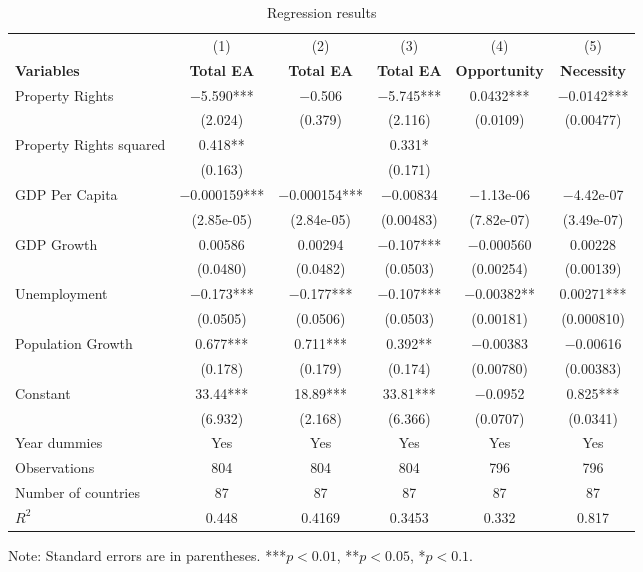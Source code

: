 \documentclass[12pt]{article}
\begin{document}
\begin{table}[H]
    \centering
    \caption{Regression results}
    \label{tab:regression_results}
    \small
    \begin{tabular}{l c c c c c}
        \toprule
        & (1) & (2) & (3) & (4) & (5) \\
        \textbf{Variables} & \textbf{Total EA} & \textbf{Total EA} & \textbf{Total EA} & \textbf{Opportunity} & \textbf{Necessity} \\
        \midrule
        Property Rights & $-$5.590*** & $-$0.506 & $-$5.745*** & 0.0432*** & $-$0.0142*** \\
        & (2.024) & (0.379) & (2.116) & (0.0109) & (0.00477) \\[6pt]
        Property Rights squared & 0.418** & & 0.331* & & \\
        & (0.163) & & (0.171) & & \\[6pt]
        GDP Per Capita & $-$0.000159*** & $-$0.000154*** & $-$0.00834 & $-$1.13e-06 & $-$4.42e-07 \\
        & (2.85e-05) & (2.84e-05) & (0.00483) & (7.82e-07) & (3.49e-07) \\[6pt]
        GDP Growth & 0.00586 & 0.00294 & $-$0.107*** & $-$0.000560 & 0.00228 \\
        & (0.0480) & (0.0482) & (0.0503) & (0.00254) & (0.00139) \\[6pt]
        Unemployment & $-$0.173*** & $-$0.177*** & $-$0.107*** & $-$0.00382** & 0.00271*** \\
        & (0.0505) & (0.0506) & (0.0503) & (0.00181) & (0.000810) \\[6pt]
        Population Growth & 0.677*** & 0.711*** & 0.392** & $-$0.00383 & $-$0.00616 \\
        & (0.178) & (0.179) & (0.174) & (0.00780) & (0.00383) \\[6pt]
        Constant & 33.44*** & 18.89*** & 33.81*** & $-$0.0952 & 0.825*** \\
        & (6.932) & (2.168) & (6.366) & (0.0707) & (0.0341) \\
        \midrule
        Year dummies & Yes & Yes & Yes & Yes & Yes \\
        Observations & 804 & 804 & 804 & 796 & 796 \\
        Number of countries & 87 & 87 & 87 & 87 & 87 \\
        $R^2$ & 0.448 & 0.4169 & 0.3453 & 0.332 & 0.817 \\
        \bottomrule
    \end{tabular}
    \par\smallskip
    \footnotesize Note: Standard errors are in parentheses. ***$p<0.01$, **$p<0.05$, *$p<0.1$.
\end{table}
\end{document}
